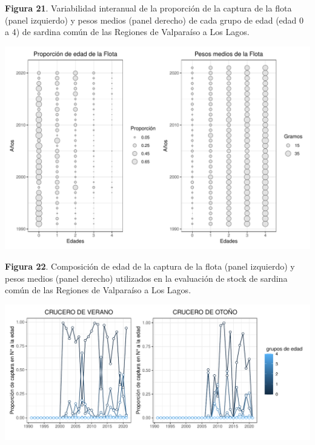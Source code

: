 \documentclass[
  spanish,
]{article}
\begin{document}
\vspace{-0.5cm}
\small

\textbf{Figura 21}. Variabilidad interanual de la proporción de la
captura de la flota (panel izquierdo) y pesos medios (panel derecho) de
cada grupo de edad (edad 0 a 4) de sardina común de las Regiones de
Valparaíso a Los Lagos. \normalsize

\begin{center}\includegraphics{FigurasInforme_Marzo/Fig22_datComp-1} \end{center}

\vspace{-0.5cm}
\small

\textbf{Figura 22}. Composición de edad de la captura de la flota (panel
izquierdo) y pesos medios (panel derecho) utilizados en la evaluación de
stock de sardina común de las Regiones de Valparaíso a Los Lagos.
\vspace{0.5cm} \normalsize

\begin{center}\includegraphics{FigurasInforme_Marzo/F23_datComp-1} \end{center}
\end{document}
